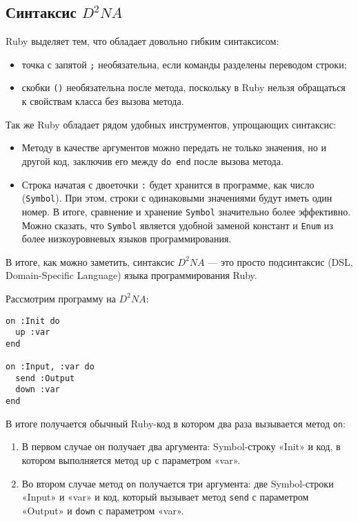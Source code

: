 \documentclass[utf8,a5paper,portrait,10pt,twoside]{eskdtext}
\begin{document}
\newpage
\subsection{Синтаксис $D^2NA$}

Ruby выделяет тем, что обладает довольно гибким синтаксисом:
\begin{itemize}
  \item точка с запятой \texttt{;} необязательна, если команды разделены
        переводом строки;
  \item скобки \texttt{()} необязательна после метода, поскольку в Ruby нельзя
        обращаться к свойствам класса без вызова метода.
\end{itemize}

Так же Ruby обладает рядом удобных инструментов, упрощающих синтаксис:
\begin{itemize}
  \item Методу в качестве аргументов можно передать не только значения, но и
        другой код, заключив его между \texttt{do end} после вызова метода.
  \item Строка начатая с двоеточки \texttt{:} будет хранится в программе, как
        число (\texttt{Symbol}). При этом, строки с одинаковыми значениями будут
        иметь один номер. В итоге, сравнение и хранение \texttt{Symbol}
        значительно более эффективно. Можно сказать, что \texttt{Symbol}
        является удобной заменой констант и \texttt{Enum} из более
        низкоуровневых языков программирования.
\end{itemize}

В итоге, как можно заметить, синтаксис $D^2NA$ — это просто подсинтаксис
(DSL, Domain-Specific Language) языка программирования Ruby.

Рассмотрим программу на $D^2NA$:
\begin{verbatim}
on :Init do
  up :var
end

on :Input, :var do
  send :Output
  down :var
end
\end{verbatim}

В итоге получается обычный Ruby-код в котором два раза вызывается метод
\texttt{on}:
\begin{enumerate}
  \item В первом случае он получает два аргумента: Symbol-строку «Init» и код,
        в котором выполняется метод \texttt{up} с параметром «var».
  \item Во втором случае метод \texttt{on} получается три аргумента: две
        Symbol-строки «Input» и «var» и код, который вызывает метод
        \texttt{send} с параметром «Output» и \texttt{down} с параметром «var».
\end{enumerate}
\end{document}
